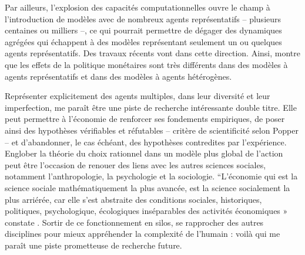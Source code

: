 Par ailleurs, l’explosion des capacités computationnelles ouvre le champ à l’introduction de modèles avec de nombreux agents représentatifs – plusieurs centaines ou milliers –, ce qui pourrait permettre de dégager des dynamiques agrégées qui échappent à des modèles représentant seulement un ou quelques agents représentatifs. Des travaux récents vont dans cette direction. Ainsi, \citet{Kaplan2016} montre que les effets de la politique monétaires sont très différents dans des modèles à agents représentatifs et dans des modèles à agents hétérogènes. 

Représenter explicitement des agents multiples, dans leur diversité et leur imperfection, me paraît être une piste de recherche intéressante double titre. Elle peut permettre à l’économie de renforcer ses fondements empiriques, de poser ainsi des hypothèses vérifiables et réfutables – critère de scientificité selon Popper – et d’abandonner, le cas échéant, des hypothèses contredites par l’expérience. Englober la théorie du choix rationnel dans un modèle plus global de l’action peut être l’occasion de renouer des liens avec les autres sciences sociales, notamment l’anthropologie, la psychologie et la sociologie. “L'économie qui est la science sociale mathématiquement la plus avancée, est la science socialement la plus arriérée, car elle s'est abstraite des conditions sociales, historiques, politiques, psychologique, écologiques inséparables des activités économiques » constate \citet{Morin1999}. Sortir de ce fonctionnement en silos, se rapprocher des autres disciplines pour mieux appréhender la complexité de l'humain : voilà qui me paraît une piste prometteuse de recherche future.





